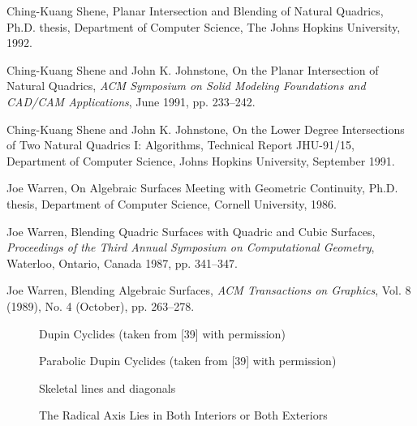 \begin{thebibliography}{999}
     Ching-Kuang Shene,
     Planar Intersection and Blending of Natural Quadrics,
     Ph.D. thesis, Department of Computer Science, The Johns Hopkins
     University, 1992.

     Ching-Kuang Shene and John K. Johnstone,
     On the Planar Intersection of Natural Quadrics,
     {\em ACM Symposium on Solid Modeling Foundations and
     CAD/CAM Applications}, 
     June 1991, pp. 233--242.

     Ching-Kuang Shene and John K. Johnstone,
     On the Lower Degree Intersections of Two Natural Quadrics I: Algorithms,
     Technical Report JHU-91/15, Department of Computer Science,
     Johns Hopkins University, September 1991.

     Joe Warren,
     On Algebraic Surfaces Meeting with Geometric Continuity,
     Ph.D. thesis, 
     Department of Computer Science, Cornell University, 1986.

     Joe Warren,
     Blending Quadric Surfaces with Quadric and Cubic Surfaces,
     {\em Proceedings of the Third Annual Symposium on Computational Geometry},
     Waterloo, Ontario, Canada 1987, pp. 341--347.

     Joe Warren,
     Blending Algebraic Surfaces,
     {\em ACM Transactions on Graphics},
     Vol. 8 (1989), No. 4 (October), pp. 263--278.

\end{thebibliography}



\begin{figure}
\vspace{18.5cm}
\caption{Dupin Cyclides (taken from [39] with permission)}
\label{fig:cyclides}
\end{figure}

\begin{figure}
\vspace{12cm}
\caption{Parabolic Dupin Cyclides (taken from [39] with permission)}
\label{fig:den-cyclides}
\end{figure}

\begin{figure}
\vspace{2in}
\caption{Skeletal lines and diagonals}
\label{fig3.1}
\end{figure}

\begin{figure}
\vspace{2in}
\caption{The Radical Axis Lies in Both Interiors or Both Exteriors}
\label{fig:int-ext}
\end{figure}

